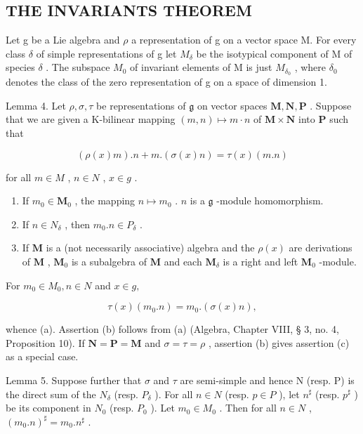 \subsection{THE INVARIANTS THEOREM}

Let g be a Lie algebra and \(\rho\) a representation of g on a vector space M. For every class \(\delta\) of simple representations of g let \(M_{\delta}\) be the isotypical component of M of species \(\delta\) . The subspace \(M_{0}\) of invariant elements of M is just \(M_{\delta_{0}}\) , where \(\delta_{0}\) denotes the class of the zero representation of g on a space of dimension 1.

Lemma 4. Let \(\rho, \sigma, \tau\) be representations of \(\mathfrak{g}\) on vector spaces \(\mathbf{M}, \mathbf{N}, \mathbf{P}\) . Suppose that we are given a K-bilinear mapping \((m, n) \mapsto m \cdot n\) of \(\mathbf{M} \times \mathbf{N}\) into \(\mathbf{P}\) such that

\[
(\rho (x) m). n + m. (\sigma (x) n) = \tau (x) (m. n)
\]

for all \(m \in M\) , \(n \in N\) , \(x \in g\) .

\begin{enumerate}
\def\labelenumi{(\alph{enumi})}
\item
  If \(m_0 \in \mathbf{M}_0\) , the mapping \(n \mapsto m_0\) . \(n\) is a \(\mathfrak{g}\) -module homomorphism.
\item
  If \(n \in N_{\delta}\) , then \(m_{0}.n \in P_{\delta}\) .
\item
  If \(\mathbf{M}\) is a (not necessarily associative) algebra and the \(\rho(x)\) are derivations of \(\mathbf{M}\) , \(\mathbf{M}_0\) is a subalgebra of \(\mathbf{M}\) and each \(\mathbf{M}_{\delta}\) is a right and left \(\mathbf{M}_0\) -module.
\end{enumerate}

For \(m_{0} \in M_{0}, n \in N\) and \(x \in g,\)

\[
\tau (x) \left(m _ {0}. n\right) = m _ {0}. (\sigma (x) n),
\]

whence (a). Assertion (b) follows from (a) (Algebra, Chapter VIII, § 3, no. 4, Proposition 10). If \(\mathbf{N} = \mathbf{P} = \mathbf{M}\) and \(\sigma = \tau = \rho\) , assertion (b) gives assertion (c) as a special case.

Lemma 5. Suppose further that \(\sigma\) and \(\tau\) are semi-simple and hence N (resp. P) is the direct sum of the \(N_{\delta}\) (resp. \(P_{\delta}\) ). For all \(n \in N\) (resp. \(p \in P\) ), let \(n^{\sharp}\) (resp. \(p^{\sharp}\) ) be its component in \(N_0\) (resp. \(P_0\) ). Let \(m_0 \in M_0\) . Then for all \(n \in N\) , \((m_0.n)^{\sharp} = m_0.n^{\sharp}\) .

